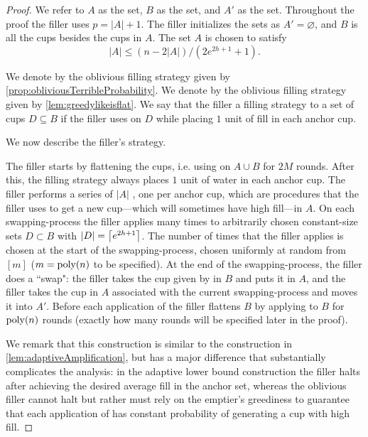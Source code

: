 \begin{proof}
  We refer to $A$ as the  set, $B$ as the
   set, and $A'$ as the  set.
  Throughout the proof the filler uses $p=|A|+1$.
  The filler initializes the sets as $A' = \varnothing$, and $B$
  is all the cups besides the cups in $A$.
  The set $A$ is chosen to satisfy 
  \begin{equation}
    \label{eq:chooseBmuchbiggerthanA}
    |A| \le (n - 2|A|) / (2e^{2h+1} + 1).
  \end{equation}

We denote by \randalg the oblivious filling
strategy given by \cref{prop:obliviousTerribleProbability}. 
We denote by \flatalg the oblivious filling
strategy given by \cref{lem:greedylikeisflat}.
We say that the filler  a filling strategy
\genericalg to a set of cups $D \subseteq B$ if the filler uses
\genericalg on $D$ while placing $1$ unit of fill in each anchor cup. 

We now describe the filler's strategy.

The filler starts by flattening the cups, i.e. using \flatalg on
$A\cup B$ for $2M$ rounds. After this, the filling strategy
always places $1$ unit of water in each anchor cup. The filler
performs a series of $|A|$ , one per
anchor cup, which are procedures that the filler uses to get a
new cup---which will sometimes have high fill---in $A$. On each
swapping-process the filler applies \randalg many times to
arbitrarily chosen constant-size sets $D \subset B$ with $|D| =
\left\lceil e^{2h+1} \right\rceil$. The number of times that the filler applies
\randalg is chosen at the start of the swapping-process, chosen
uniformly at random from $[m]$ ($m = \operatorname{\text{poly}}(n)$ to be
specified). At the end of the swapping-process, the filler does a
``swap": the filler takes the cup given by \randalg in $B$ and
puts it in $A$, and the filler takes the cup in $A$ associated
with the current swapping-process and moves it into $A'$.
Before each application of \randalg the filler flattens $B$ by
applying \flatalg to $B$ for $\operatorname{\text{poly}}(n)$ rounds (exactly how many
rounds will be specified later in the proof). 

We remark that this construction is similar to the construction
in \cref{lem:adaptiveAmplification}, but has a major difference
that substantially complicates the analysis: in the adaptive
lower bound construction the filler halts after achieving the
desired average fill in the anchor set, whereas the oblivious
filler cannot halt but rather must rely on the emptier's
greediness to guarantee that each application of \randalg has
constant probability of generating a cup with high fill.


\end{proof}
